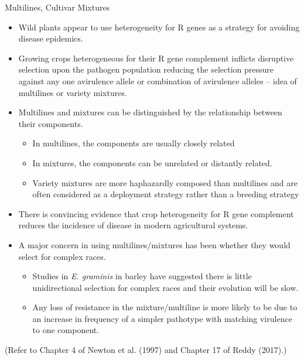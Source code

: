 \documentclass[11pt,dvipsnames,ignorenonframetext,aspectratio=169]{beamer}
\providecommand{\tightlist}{%
  \setlength{\itemsep}{0pt}\setlength{\parskip}{0pt}}
\begin{document}
\begin{frame}{Multilines, Cultivar Mixtures}
\begin{itemize}
\tightlist
\item
  Wild plants appear to use heterogeneity for R genes as a strategy for
  avoiding disease epidemics.
\item
  Growing crops heterogeneous for their R gene complement inflicts
  disruptive selection upon the pathogen population reducing the
  selection pressure against any one avirulence allele or combination of
  avirulence alleles -- idea of multilines or variety mixtures.
\item
  Multilines and mixtures can be distinguished by the relationship
  between their components.

  \begin{itemize}
  \tightlist
  \item
    In multilines, the components are usually closely related
  \item
    In mixtures, the components can be unrelated or distantly related.
  \item
    Variety mixtures are more haphazardly composed than multilines and
    are often considered as a deployment strategy rather than a breeding
    strategy
  \end{itemize}
\end{itemize}
\end{frame}

\begin{frame}{}
\protect\hypertarget{section-7}{}
\begin{itemize}
\tightlist
\item
  There is convincing evidence that crop heterogeneity for R gene
  complement reduces the incidence of disease in modern agricultural
  systems.
\item
  A major concern in using multilines/mixtures has been whether they
  would select for complex races.

  \begin{itemize}
  \tightlist
  \item
    Studies in \textit{E. graminis} in barley have suggested there is
    little unidirectional selection for complex races and their
    evolution will be slow.
  \item
    Any loss of resistance in the mixture/multiline is more likely to be
    due to an increase in frequency of a simpler pathotype with matching
    virulence to one component.
  \end{itemize}
\end{itemize}

(Refer to Chapter 4 of Newton et al. (1997) and Chapter 17 of Reddy
(2017).)
\end{frame}
\end{document}
